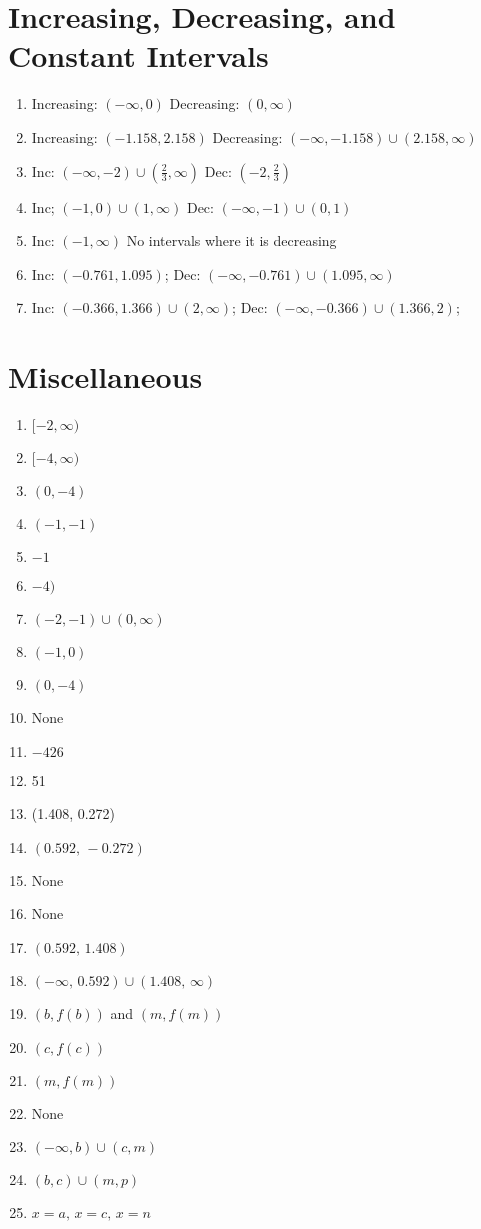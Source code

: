 \section*{Increasing, Decreasing, and Constant Intervals}

\begin{enumerate}
	\item Increasing: $(-\infty, 0)$ \quad Decreasing: $(0, \infty)$
	\item Increasing: $(-1.158, 2.158)$ \quad Decreasing: $(-\infty, -1.158) \cup (2.158, \infty)$
    \item Inc: $(-\infty,-2) \cup \left(\frac{2}{3},\infty\right)$ \quad Dec: $\left(-2, \frac{2}{3}\right)$
    \item Inc; $(-1,0) \cup (1, \infty)$ \quad Dec: $(-\infty, -1) \cup (0,1)$
    \item Inc: $(-1,\infty)$ \quad No intervals where it is decreasing
    \item Inc: $(-0.761, 1.095)$; \quad Dec: $(-\infty, -0.761) \cup (1.095, \infty)$
    \item Inc: $(-0.366,1.366) \cup (2, \infty)$; \quad
    Dec: $(-\infty, -0.366) \cup (1.366,2)$;
\end{enumerate}

\section*{Miscellaneous}

\begin{multicols}{2}
\begin{enumerate}
    \item $[-2, \infty)$
    \item $[-4, \infty)$
    \item $(0, -4)$
    \item $(-1,-1)$
    \item $-1$
    \item $-4)$
    \item $(-2, -1) \cup (0, \infty)$
    \item $(-1,0)$
    \item $(0,-4)$
    \item None
    \item $-426$
    \item 51
    \item (1.408, 0.272)
    \item $(0.592, \, -0.272)$
    \item None
    \item None
    \item $(0.592, \, 1.408)$
    \item $(-\infty, \, 0.592) \cup (1.408, \, \infty)$
	\item $(b, f(b))$ and $(m, f(m))$
	\item $(c, f(c))$
	\item $(m, f(m))$
	\item None
	\item $(-\infty, b) \cup (c, m)$
	\item $(b, c) \cup (m, p)$
	\item $x = a, \, x = c, \, x = n$
\end{enumerate}
\end{multicols}